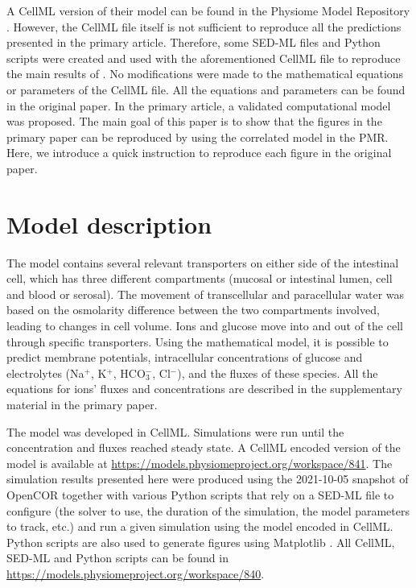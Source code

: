 \documentclass[fleqn,10pt]{physiome}
\begin{document}
A CellML version \citep{cuellar2003overview} of their model can be found in the Physiome Model Repository \citep{yu_physiome_2011}. However, the CellML file itself is not sufficient to reproduce all the predictions presented in the primary article. Therefore, some SED-ML files \citep{waltemath2011reproducible} and Python scripts were created and used with the aforementioned CellML file to reproduce the main results of \citet{afshar2021computational}. No modifications were made to the mathematical equations or parameters of the CellML file. All the equations and parameters can be found in the original paper. In the primary article, a validated computational model was proposed. The main goal of this paper is to show that the figures in the primary paper can be reproduced by using the correlated model in the PMR. Here, we introduce a quick instruction to reproduce each figure in the original paper.


\section{Model description}
The model contains several relevant transporters on either side of the intestinal cell, which has three different compartments (mucosal or intestinal lumen, cell and blood or serosal). The movement of transcellular and paracellular water was based on the osmolarity difference between the two compartments involved, leading to changes in cell volume. Ions and glucose move into and out of the cell through specific transporters. Using the mathematical model, it is possible to predict membrane potentials, intracellular concentrations of glucose and electrolytes (Na$^+$, K$^+$, HCO$_3^-$, Cl$^-$), and the fluxes of these species. All the equations for ions' fluxes and concentrations are described in the supplementary material in the primary paper. 

The model was developed in CellML. Simulations were run until the concentration and fluxes reached steady state. A CellML encoded version of the model is available at \url{https://models.physiomeproject.org/workspace/841}. The simulation results presented here were produced using the 2021-10-05 snapshot of OpenCOR \citep{garny2015opencor} together with various Python scripts that rely on a SED-ML file to configure (the solver to use, the duration of the simulation, the model parameters to track, etc.) and run a given simulation using the model encoded in CellML. Python scripts are also used to generate figures using Matplotlib \citep{Hunter:2007}. All CellML, SED-ML and Python scripts can be found in \url{https://models.physiomeproject.org/workspace/840}.
\end{document}
